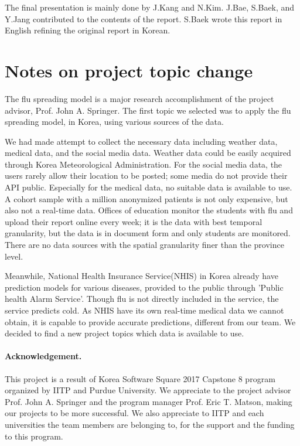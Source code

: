 \documentclass{article}
\begin{document}
\begin{appendices}
The final presentation is mainly done by J.Kang and N.Kim. J.Bae, S.Baek, and
Y.Jang contributed to the contents of the report. S.Baek wrote this report in
English refining the original report in Korean.

\section{Notes on project topic change}
The flu spreading model is a major research accomplishment of the project
advisor, Prof. John A. Springer. The first topic we selected was to apply the
flu spreading model, in Korea, using various sources of the data.

We had made attempt to collect the necessary data including weather data,
medical data, and the social media data. Weather data could be easily acquired
through Korea Meteorological Administration. For the social media data, the
users rarely allow their location to be posted; some media do not provide
their API public. Especially for the medical data, no suitable data is
available to use. A cohort sample with a million anonymized patients is not
only expensive, but also not a real-time data. Offices of education
monitor the students with flu and upload their report online every week; it is
the data with best temporal granularity, but the data is in document form and
only students are monitored. There are no data sources with the spatial
granularity finer than the province level.

Meanwhile, National Health Insurance Service(NHIS) in Korea already have
prediction models for various diseases, provided to the public through 'Public
health Alarm Service'.
Though flu is not directly included in the service, the service predicts cold. As NHIS have
its own real-time medical data we cannot obtain, it is capable to provide
accurate predictions, different from our team. We decided to find a new project topics
which data is available to use.
\end{appendices}
\newpage
\paragraph{Acknowledgement.}
This project is a result of Korea Software Square 2017 Capstone 8 program
organized by IITP and Purdue University. We appreciate to the project advisor Prof. John
A. Springer and the program manager Prof. Eric T. Matson, making our projects to
be more successful. We also appreciate to IITP and each universities the
team members are belonging to, for the support and the funding to this program.
\nocite{ARTICLE:breiman2001random,LECTURE:BaggingRF,MANUAL:LightGBMDoc}
 

\newpage
\end{document}
